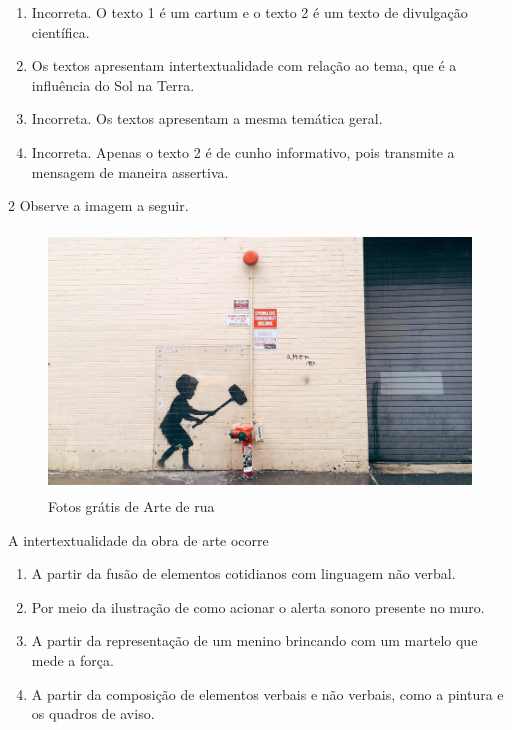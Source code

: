 \begin{enumerate}
\def\labelenumi{\alph{enumi})}
\item Incorreta. O texto 1 é um cartum e o texto 2 é um texto de divulgação
científica.
\item Os textos apresentam intertextualidade com relação ao tema, que é a
influência do Sol na Terra.
\item Incorreta. Os textos apresentam a mesma temática geral.
\item Incorreta. Apenas o texto 2 é de cunho informativo, pois transmite a
mensagem de maneira assertiva.
\end{enumerate}

\num{2} Observe a imagem a seguir.

\begin{figure}
\centering
\includegraphics[width=4.69016in,height=2.73611in]{./imgSAEB_6_POR/media/image13.jpeg}
\caption{Fotos grátis de Arte de rua}
\end{figure}


A intertextualidade da obra de arte ocorre

\begin{enumerate}
\def\labelenumi{\alph{enumi})}
\item A partir da fusão de elementos cotidianos com linguagem não verbal.
\item Por meio da ilustração de como acionar o alerta sonoro presente no
muro.
\item A partir da representação de um menino brincando com um martelo que
mede a força.
\item A partir da composição de elementos verbais e não verbais, como a
pintura e os quadros de aviso.
\end{enumerate}

